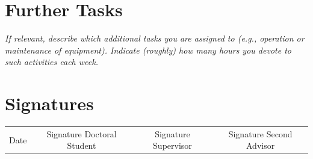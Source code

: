 \documentclass[11pt]{article}
\newcommand{\suggestion}[1]{{\itshape #1}}
\begin{document}
\section{Further Tasks}
\suggestion{
If relevant, describe which additional tasks you are assigned to (e.g., operation or maintenance of equipment).
Indicate (roughly) how many hours you devote to such activities each week.
}



\section*{Signatures}

\begin{table}[h!]
\begin{tabular}{llll}
                         &                                                &                                          &                                              \\ \hline
\multicolumn{1}{c}{Date} & \multicolumn{1}{c}{Signature Doctoral Student} & \multicolumn{1}{c}{Signature Supervisor} & \multicolumn{1}{c}{Signature Second Advisor}
\end{tabular}
\end{table}
\end{document}
